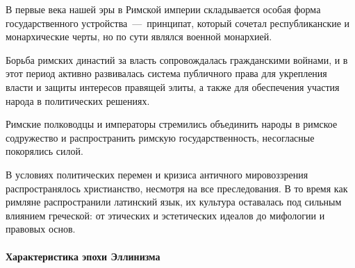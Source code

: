 В первые века нашей эры в Римской империи складывается особая форма государственного устройства~---~принципат, который сочетал республиканские и монархические черты, но по сути являлся военной монархией. 

Борьба римских династий за власть сопровождалась гражданскими войнами, и в этот период активно развивалась система публичного права для укрепления власти и защиты интересов правящей элиты, а также для обеспечения участия народа в политических решениях. 

Римские полководцы и императоры стремились объединить народы в римское содружество и распространить римскую государственность, несогласные покорялись силой. 

В условиях политических перемен и кризиса античного мировоззрения распространялось христианство, несмотря на все преследования. В то время как римляне распространили латинский язык, их культура оставалась под сильным влиянием греческой: от этических и эстетических идеалов до мифологии и правовых основ.

\paragraph{Характеристика эпохи Эллинизма}

